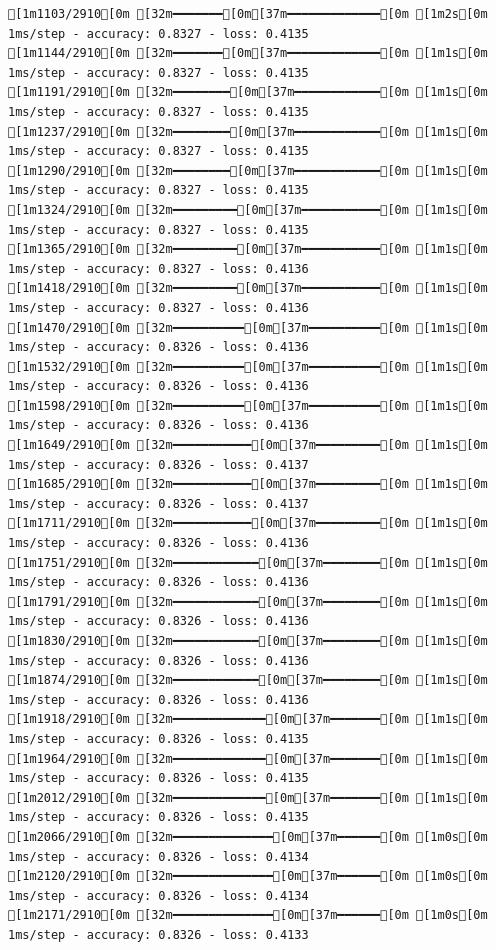 \documentclass[
  letterpaper,
  DIV=11,
  numbers=noendperiod]{scrartcl}
\begin{document}
\begin{verbatim}
[1m1103/2910[0m [32m━━━━━━━[0m[37m━━━━━━━━━━━━━[0m [1m2s[0m 1ms/step - accuracy: 0.8327 - loss: 0.4135
[1m1144/2910[0m [32m━━━━━━━[0m[37m━━━━━━━━━━━━━[0m [1m1s[0m 1ms/step - accuracy: 0.8327 - loss: 0.4135
[1m1191/2910[0m [32m━━━━━━━━[0m[37m━━━━━━━━━━━━[0m [1m1s[0m 1ms/step - accuracy: 0.8327 - loss: 0.4135
[1m1237/2910[0m [32m━━━━━━━━[0m[37m━━━━━━━━━━━━[0m [1m1s[0m 1ms/step - accuracy: 0.8327 - loss: 0.4135
[1m1290/2910[0m [32m━━━━━━━━[0m[37m━━━━━━━━━━━━[0m [1m1s[0m 1ms/step - accuracy: 0.8327 - loss: 0.4135
[1m1324/2910[0m [32m━━━━━━━━━[0m[37m━━━━━━━━━━━[0m [1m1s[0m 1ms/step - accuracy: 0.8327 - loss: 0.4135
[1m1365/2910[0m [32m━━━━━━━━━[0m[37m━━━━━━━━━━━[0m [1m1s[0m 1ms/step - accuracy: 0.8327 - loss: 0.4136
[1m1418/2910[0m [32m━━━━━━━━━[0m[37m━━━━━━━━━━━[0m [1m1s[0m 1ms/step - accuracy: 0.8327 - loss: 0.4136
[1m1470/2910[0m [32m━━━━━━━━━━[0m[37m━━━━━━━━━━[0m [1m1s[0m 1ms/step - accuracy: 0.8326 - loss: 0.4136
[1m1532/2910[0m [32m━━━━━━━━━━[0m[37m━━━━━━━━━━[0m [1m1s[0m 1ms/step - accuracy: 0.8326 - loss: 0.4136
[1m1598/2910[0m [32m━━━━━━━━━━[0m[37m━━━━━━━━━━[0m [1m1s[0m 1ms/step - accuracy: 0.8326 - loss: 0.4136
[1m1649/2910[0m [32m━━━━━━━━━━━[0m[37m━━━━━━━━━[0m [1m1s[0m 1ms/step - accuracy: 0.8326 - loss: 0.4137
[1m1685/2910[0m [32m━━━━━━━━━━━[0m[37m━━━━━━━━━[0m [1m1s[0m 1ms/step - accuracy: 0.8326 - loss: 0.4137
[1m1711/2910[0m [32m━━━━━━━━━━━[0m[37m━━━━━━━━━[0m [1m1s[0m 1ms/step - accuracy: 0.8326 - loss: 0.4136
[1m1751/2910[0m [32m━━━━━━━━━━━━[0m[37m━━━━━━━━[0m [1m1s[0m 1ms/step - accuracy: 0.8326 - loss: 0.4136
[1m1791/2910[0m [32m━━━━━━━━━━━━[0m[37m━━━━━━━━[0m [1m1s[0m 1ms/step - accuracy: 0.8326 - loss: 0.4136
[1m1830/2910[0m [32m━━━━━━━━━━━━[0m[37m━━━━━━━━[0m [1m1s[0m 1ms/step - accuracy: 0.8326 - loss: 0.4136
[1m1874/2910[0m [32m━━━━━━━━━━━━[0m[37m━━━━━━━━[0m [1m1s[0m 1ms/step - accuracy: 0.8326 - loss: 0.4136
[1m1918/2910[0m [32m━━━━━━━━━━━━━[0m[37m━━━━━━━[0m [1m1s[0m 1ms/step - accuracy: 0.8326 - loss: 0.4135
[1m1964/2910[0m [32m━━━━━━━━━━━━━[0m[37m━━━━━━━[0m [1m1s[0m 1ms/step - accuracy: 0.8326 - loss: 0.4135
[1m2012/2910[0m [32m━━━━━━━━━━━━━[0m[37m━━━━━━━[0m [1m1s[0m 1ms/step - accuracy: 0.8326 - loss: 0.4135
[1m2066/2910[0m [32m━━━━━━━━━━━━━━[0m[37m━━━━━━[0m [1m0s[0m 1ms/step - accuracy: 0.8326 - loss: 0.4134
[1m2120/2910[0m [32m━━━━━━━━━━━━━━[0m[37m━━━━━━[0m [1m0s[0m 1ms/step - accuracy: 0.8326 - loss: 0.4134
[1m2171/2910[0m [32m━━━━━━━━━━━━━━[0m[37m━━━━━━[0m [1m0s[0m 1ms/step - accuracy: 0.8326 - loss: 0.4133

\end{verbatim}
\end{document}
